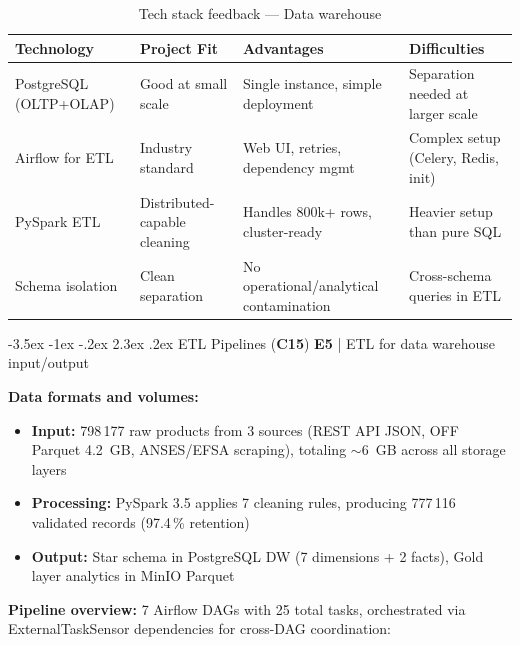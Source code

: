 \documentclass[a4paper,11pt,oneside,openany]{report}
\makeatletter
\renewcommand\section{\@startsection{section}{1}{\z@}%
  {-3.5ex \@plus -1ex \@minus -.2ex}%
  {2.3ex \@plus.2ex}%
  {\normalfont\Large\bfseries\color{ntgreen}}}
\newcommand{\competence}[1]{\textbf{\textcolor{ntgreen}{#1}}}
\newcommand{\evaluation}[1]{\textbf{\textcolor{ntblue}{#1}}}
\makeatother
\begin{document}
\begin{table}[H]
\centering
\caption{Tech stack feedback --- Data warehouse}
\label{tab:tech-feedback}
\begin{tabularx}{\textwidth}{L{2.8cm} L{3cm} L{3.5cm} L{3.5cm}}
\toprule
\textbf{Technology} & \textbf{Project Fit} & \textbf{Advantages} & \textbf{Difficulties} \\
\midrule
PostgreSQL (OLTP+OLAP) & Good at small scale & Single instance, simple deployment & Separation needed at larger scale \\
Airflow for ETL & Industry standard & Web UI, retries, dependency mgmt & Complex setup (Celery, Redis, init) \\
PySpark ETL & Distributed-capable cleaning & Handles 800k+ rows, cluster-ready & Heavier setup than pure SQL \\
Schema isolation & Clean separation & No operational/analytical contamination & Cross-schema queries in ETL \\
\bottomrule
\end{tabularx}
\end{table}


\section{ETL Pipelines (\competence{C15})}
\label{sec:c15}
{\small\evaluation{E5} | ETL for data warehouse input/output}

\textbf{Data formats and volumes:}
\begin{itemize}[nosep]
  \item \textbf{Input:} 798\,177 raw products from 3 sources (REST API JSON,
        OFF Parquet 4.2~GB, ANSES/EFSA scraping), totaling $\sim$6~GB across
        all storage layers
  \item \textbf{Processing:} PySpark 3.5 applies 7 cleaning rules, producing
        777\,116 validated records (97.4\,\% retention)
  \item \textbf{Output:} Star schema in PostgreSQL DW (7 dimensions + 2 facts),
        Gold layer analytics in MinIO Parquet
\end{itemize}

\textbf{Pipeline overview:} 7 Airflow DAGs with 25 total tasks, orchestrated
via ExternalTaskSensor dependencies for cross-DAG coordination:
\end{document}
